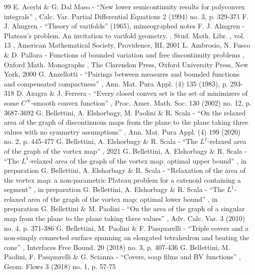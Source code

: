 \documentclass[11pt]{article}
\numberwithin{equation}{section}
\theoremstyle{definition}
\begin{document}

\begin{thebibliography}{99}
 E. Acerbi \& G. Dal Maso - “New lower semicontinuity results for polyconvex integrals” , Calc. Var. Partial Differential Equations 2 (1994) no. 3, p. 329-371
 F. J. Almgren - “Theory of varifolds” (1965), mimeographed notes
 F. J. Almgren - Plateau’s problem. An invitation to varifold geometry. , Stud. Math. Libr. , vol. 13 , American Mathematical Society, Providence, RI, 2001
 L. Ambrosio, N. Fusco \& D. Pallara - Functions of bounded variation and free discontinuity problems , Oxford Math. Monographs , The Clarendon Press, Oxford University Press, New York, 2000
 G. Anzellotti - “Pairings between measures and bounded functions and compensated compactness” , Ann. Mat. Pura Appl. (4) 135 (1983), p. 293-318
 D. Azagra \& J. Ferrera - “Every closed convex set is the set of minimizers of some $C^\infty $-smooth convex function” , Proc. Amer. Math. Soc. 130 (2002) no. 12, p. 3687-3692
 G. Bellettini, A. Elshorbagy, M. Paolini \& R. Scala - “On the relaxed area of the graph of discontinuous maps from the plane to the plane taking three values with no symmetry assumptions” , Ann. Mat. Pura Appl. (4) 199 (2020) no. 2, p. 445-477
 G. Bellettini, A. Elshorbagy \& R. Scala - “The $L^1$-relaxed area of the graph of the vortex map” , 2021
 G. Bellettini, A. Elshorbagy \& R. Scala - “The $L^1$-relaxed area of the graph of the vortex map: optimal upper bound” , in preparation
 G. Bellettini, A. Elshorbagy \& R. Scala - “Relaxation of the area of the vortex map: a non-parametric Plateau problem for a catenoid containing a segment” , in preparation
 G. Bellettini, A. Elshorbagy \& R. Scala - “The $L^1$-relaxed area of the graph of the vortex map: optimal lower bound” , in preparation
 G. Bellettini \& M. Paolini - “On the area of the graph of a singular map from the plane to the plane taking three values” , Adv. Calc. Var. 3 (2010) no. 4, p. 371-386
 G. Bellettini, M. Paolini \& F. Pasquarelli - “Triple covers and a non-simply connected surface spanning an elongated tetrahedron and beating the cone” , Interfaces Free Bound. 20 (2018) no. 3, p. 407-436
 G. Bellettini, M. Paolini, F. Pasquarelli \& G. Scianna - “Covers, soap films and BV functions” , Geom. Flows 3 (2018) no. 1, p. 57-75

\end{thebibliography}
\end{document}
